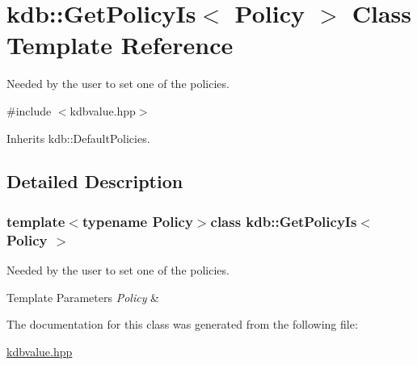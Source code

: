 \hypertarget{classkdb_1_1GetPolicyIs}{\section{kdb\+:\+:Get\+Policy\+Is$<$ Policy $>$ Class Template Reference}
\label{classkdb_1_1GetPolicyIs}
}


Needed by the user to set one of the policies.  




{\ttfamily \#include $<$kdbvalue.\+hpp$>$}



Inherits kdb\+::\+Default\+Policies.



\subsection{Detailed Description}
\subsubsection*{template$<$typename Policy$>$class kdb\+::\+Get\+Policy\+Is$<$ Policy $>$}

Needed by the user to set one of the policies. 


\begin{DoxyTemplParams}{Template Parameters}
{\em Policy} & \\
\hline
\end{DoxyTemplParams}


The documentation for this class was generated from the following file\+:\begin{DoxyCompactItemize}
\item 
\hyperlink{kdbvalue_8hpp}{kdbvalue.\+hpp}\end{DoxyCompactItemize}

